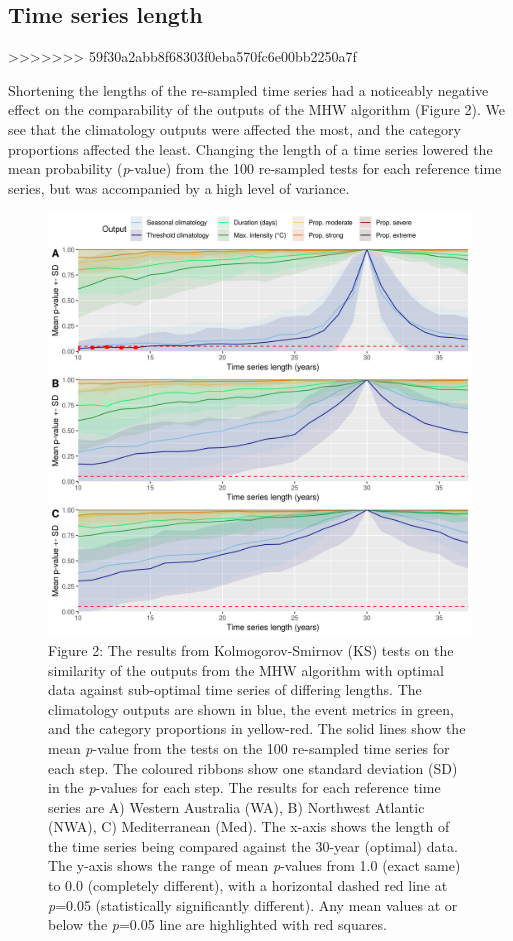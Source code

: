 \documentclass[]{article}
\begin{document}
{\subsection{Time series length}\label{time-series-length}
>>>>>>> 59f30a2abb8f68303f0eba570fc6e00bb2250a7f

Shortening the lengths of the re-sampled time series had a noticeably
negative effect on the comparability of the outputs of the MHW algorithm
(Figure 2). We see that the climatology outputs were affected the most,
and the category proportions affected the least. Changing the length of
a time series lowered the mean probability (\emph{p}-value) from the 100
re-sampled tests for each reference time series, but was accompanied by
a high level of variance.

\begin{figure}
\centering
\includegraphics{../LaTeX/fig_2.png}
\caption{Figure 2: The results from Kolmogorov-Smirnov (KS) tests on the
similarity of the outputs from the MHW algorithm with optimal data
against sub-optimal time series of differing lengths. The climatology
outputs are shown in blue, the event metrics in green, and the category
proportions in yellow-red. The solid lines show the mean \emph{p}-value
from the tests on the 100 re-sampled time series for each step. The
coloured ribbons show one standard deviation (SD) in the \emph{p}-values
for each step. The results for each reference time series are A) Western
Australia (WA), B) Northwest Atlantic (NWA), C) Mediterranean (Med). The
x-axis shows the length of the time series being compared against the
30-year (optimal) data. The y-axis shows the range of mean
\emph{p}-values from 1.0 (exact same) to 0.0 (completely different),
with a horizontal dashed red line at \emph{p}=0.05 (statistically
significantly different). Any mean values at or below the \emph{p}=0.05
line are highlighted with red squares.}
\end{figure}

}
\end{document}
